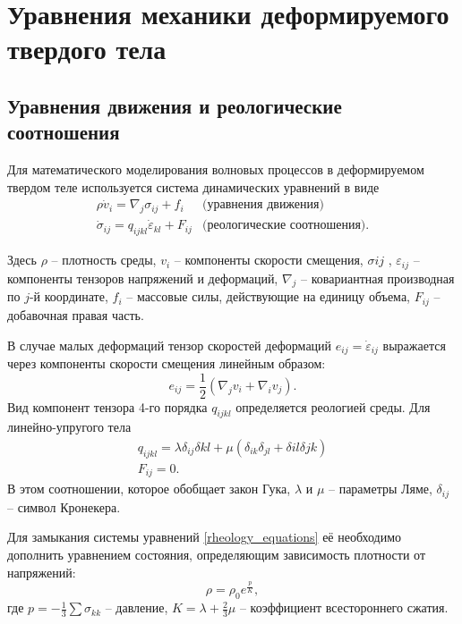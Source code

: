 \section{Уравнения механики деформируемого твердого тела}
\subsection{Уравнения движения и реологические соотношения}
Для математического моделирования волновых процессов в деформируемом твердом
теле используется система динамических уравнений \cite{novatsky,sedov} в виде
\begin{eqnarray}
\label{rheology_equations}
\rho\dot{v}_i=\nabla_j\sigma_{ij}+f_i & \textrm{(уравнения движения)}\nonumber\\
\dot{\sigma}_{ij}=q_{ijkl}\dot{\varepsilon}_{kl}+F_{ij} & \textrm{(реологические
соотношения).}
\end{eqnarray}

Здесь $\rho$ – плотность среды, $v_i$ – компоненты скорости смещения,
$\sigma{ij}$ , $\varepsilon_{ij}$ -- компоненты тензоров напряжений и деформаций,
$\nabla_j$ – ковариантная производная по $j$-й координате, $f_i$ – массовые
силы, действующие на единицу объема, $F_{ij}$ -- добавочная правая часть.

В случае малых деформаций тензор скоростей деформаций $e_{ij}=\dot{\varepsilon}_{ij}$ 
выражается через компоненты скорости смещения линейным образом:
\begin{equation}
e_{ij}=\frac{1}{2}(\nabla_j v_i+\nabla_i v_j).
\end{equation}
Вид компонент тензора 4-го порядка $q_{ijkl}$ определяется реологией среды. Для 
линейно-упругого тела
\begin{eqnarray}
\label{tensor_qijkl}
q_{ijkl}=\lambda\delta_{ij}\delta{kl}+\mu(\delta_{ik}\delta_{jl}+\delta{il}
\delta{jk})\nonumber\\
F_{ij}=0.
\end{eqnarray}
В этом соотношении, которое обобщает закон Гука, $\lambda$ и $\mu$ -- параметры
Ляме, $\delta_{ij}$ -- символ Кронекера.

Для замыкания системы уравнений \ref{rheology_equations} её необходимо дополнить
уравнением состояния, определяющим зависимость плотности от напряжений:
$$\rho=\rho_0e^{\frac{p}{K}},$$
где $p=-\frac{1}{3}\sum\sigma_{kk}$ -- давление, $K=\lambda+\frac{2}{3}\mu$ --
коэффициент всестороннего сжатия.

